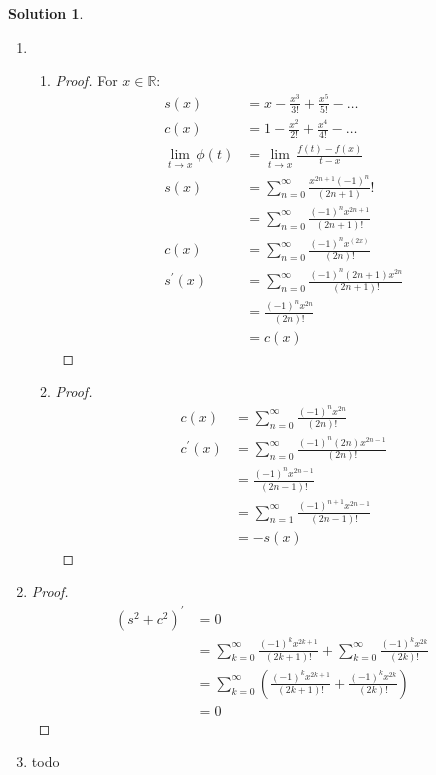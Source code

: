 \documentclass[12pt]{article}
\theoremstyle{definition} %
\newtheorem{solution}{Solution}
\theoremstyle{plain} %
\begin{document}
\begin{solution}
    \begin{enumerate}
        \item  \begin{enumerate}
            \item  \begin{proof}
        For $x\in\mathbb{R}$: 
   \begin{align}
    s(x) &= x-\frac{x^{3}}{3!}+\frac{x^{5}}{5!}-\ldots \\[10pt] 
    c(x) &= 1-\frac{x^{2}}{2!}+\frac{x^{4}}{4!}-\ldots \\[10pt] 
    \lim_{t \to x} \phi(t)&=\lim_{t \to x} \frac{f(t)-f(x)}{t-x}\\[10pt] 
    s(x)&=\sum_{n=0}^{\infty} \frac{x^{2n+1}(-1)^{n}}{(2n+1)}! \\[10pt] 
    &=\sum_{n=0}^{\infty} \frac{(-1)^{n}x^{2n+1}}{\left( 2n+1 \right)! } \\[10pt] 
    c(x) &= \sum_{n=0}^{\infty} \frac{(-1)^{n}x^{(2x)}}{\left( 2n \right)! }\\[10pt] 
    s^\prime (x)&=\sum_{n=0}^{\infty} \frac{(-1)^{n}(2n+1)x^{2n}}{\left( 2n+1 \right) !} \\[10pt] 
    &= \frac{(-1)^{n}x^{2n}}{\left( 2n \right) !} \\[10pt] 
    &= c(x)
   \end{align} 
    \end{proof}
    \item \begin{proof}
        \begin{align}
            c(x)&=\sum_{n=0}^{\infty} \frac{(-1)^{n}x^{2n}}{\left( 2n \right) !}\\[10pt] 
            c^\prime (x)&=\sum_{n=0}^{\infty} \frac{(-1)^{n}(2n)x^{2n-1}}{(2n)!}\\[10pt] 
            &= \frac{(-1)^{n}x^{2n-1}}{(2n-1)!}\\[10pt] 
            &= \sum_{n=1}^{\infty} \frac{(-1)^{n+1}x^{2n-1}}{(2n-1)!}\\[10pt] 
            &= -s(x)
        \end{align}
    \end{proof}
        \end{enumerate}    
        \item \begin{proof}
            \begin{align}
            \left( s^{2}+c^{2} \right)^\prime &=0 \\[10pt] 
            &= \sum_{k=0}^{\infty} \frac{(-1)^{k}x^{2k+1}}{(2k+1)!} + \sum_{k=0}^{\infty} \frac{(-1)^{k}x^{2k}}{(2k)!}\\[10pt] 
            &= \sum_{k=0}^{\infty} \left( \frac{(-1)^{k}x^{2k+1}}{(2k+1)!} + \frac{(-1)^{k}x^{2k}}{(2k)!} \right) \\[10pt] 
            &= 0
        \end{align}
        \end{proof}    
        \item todo
    \end{enumerate}
   \end{solution}
\end{document}
